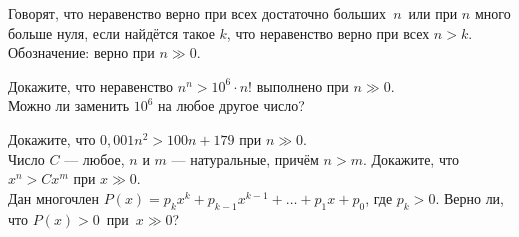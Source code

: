 \documentclass[a4paper,12pt]{article}
\begin{document}
Говорят, что неравенство верно
 при всех достаточно больших~$n$\ или
 при $n$ много больше нуля,
если найд\"ется такое $k$, что неравенство верно
при всех $n>k$.
Обозначение: верно при $n\gg 0$.

 Докажите, что неравенство
$n^n>10^{6}\cdot n!$ выполнено
при $n\gg 0$.\\
 Можно ли заменить $10^6$ на любое другое число?

Докажите, что $0,001n^2>100n+179$ при $n\gg 0$.\\
Число $C$ --- любое, $n$ и $m$ --- натуральные, прич\"ем $n>m$.
Докажите, что $x^n>Cx^m$ при $x\gg 0$.\\
Дан многочлен $P(x)=p_k x^k+p_{k-1}x^{k-1}+\dots+p_1x+p_0$,
где $p_k>0$. Верно ли, что $P(x)>0$~при~$x\gg 0$?
















\end{document}
